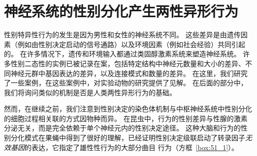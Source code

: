 \section{神经系统的性别分化产生两性异形行为}

性别特异性行为的发生是因为男性和女性的神经系统不同。
这些差异是由遗传因素（例如由性别决定启动的信号通路）以及环境因素（例如社会经验）共同引起的。
在许多情况下，遗传和环境输入都通过类固醇激素系统来塑造神经系统。
许多性别二态性的实例已被记录在案，包括特定结构中神经元数量和大小的差异、不同神经元群中基因表达的差异，以及连接模式和数量的差异。
在这里，我们研究了一些案例，在这些案例中，对实验动物的研究提供了见解。
在后面的部分中，我们将询问类似的机制是否是人类两性异形行为的基础。


然而，在继续之前，我们注意到性别决定的染色体机制与中枢神经系统中性别分化的细胞过程相关联的方式因物种而异。
在昆虫中，行为的性别差异与性腺的激素分泌无关，而是完全依赖于单个神经元内的性别决定途径。
这种大脑和行为的性别分化模式在果蝇中得到了很好的理解，已经证明性别决定级联启动了转录因子\textit{无效基因}的表达，它指定了雄性性行为的大部分曲目 行为（方框~\ref{box:51_1}）。


